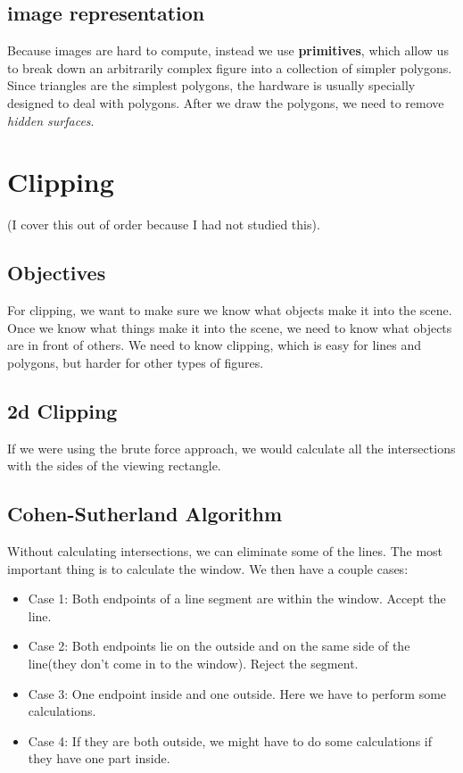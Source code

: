 \documentclass[portrait, 10pt, a4paper]{article}
\begin{document}
\begin{multicols*}{3}
	\subsection{image representation}
		Because images are hard to compute, instead we use \textbf{primitives}, which allow us  to break down an 
		arbitrarily complex figure into a collection of simpler polygons. Since triangles are the simplest polygons, 
		the hardware is usually specially designed to deal with polygons. After we draw the polygons, we need to remove
		\textit{hidden surfaces}.
\section{Clipping}
		(I cover this out of order because I had not studied this).
		\subsection{Objectives}
			For clipping, we want to make sure we know what objects make it into the scene. Once we know what things 
			make it into the scene, we need to know what objects are in front of others. We need to know clipping, 
			which is easy for lines and polygons, but harder for other types of figures. 
		\subsection{2d Clipping}
			If we were using the brute force approach, we would calculate all the intersections with the sides of the
			viewing rectangle.
		\subsection{Cohen-Sutherland Algorithm}
			Without calculating intersections, we can eliminate some of the lines. The most important
			thing is to calculate the window. We then have a couple cases:
			\begin{itemize}
				\item{Case 1:} Both endpoints of a line segment are within the window. Accept the line.
				\item{Case 2:} Both endpoints lie on the outside and on the same side of the line(they don't
								come in to the window). Reject the segment.
				\item{Case 3:} One endpoint inside and one outside. Here we have to perform some calculations.
				\item{Case 4:} If they are both outside, we might have to do some calculations if they have one 
								part inside.
			\end{itemize}

\end{multicols*}
\end{document}
